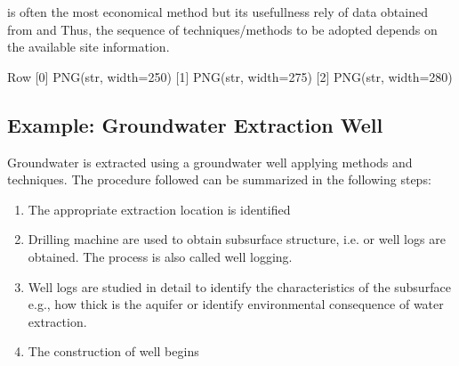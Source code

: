 \documentclass[letterpaper,10pt,english]{sphinxmanual}
\begin{document}
 is often the most economical method but its usefullness rely of data obtained from  and  Thus, the sequence of techniques/methods to be adopted depends on the available site information.

\begin{sphinxVerbatim}[commandchars=\\\{\}]
   
   
   

  
\end{sphinxVerbatim}

\begin{sphinxVerbatim}[commandchars=\\\{\}]
Row
    [0] PNG(str, width=250)
    [1] PNG(str, width=275)
    [2] PNG(str, width=280)
\end{sphinxVerbatim}


\subsection{Example: Groundwater Extraction Well}
\label{\detokenize{contents/background/03_basic_hydrogeology:example-groundwater-extraction-well}}
Groundwater is extracted using a groundwater well applying  methods and techniques. The procedure followed can be summarized in the following steps:
\begin{enumerate}
%
\item {} 
The appropriate extraction location is identified

\item {} 
Drilling machine are used to obtain sub\sphinxhyphen{}surface structure, i.e. or well logs are obtained. The process is also called well logging.

\item {} 
Well logs are studied in detail to identify the characteristics of the subsurface\sphinxhyphen{} e.g., how thick is the aquifer or identify environmental consequence of water extraction.

\item {} 
The construction of well begins

\end{enumerate}
\end{document}
